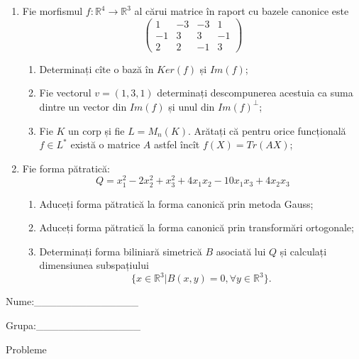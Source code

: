 \documentclass{article}
\begin{document}
\begin{enumerate}
 \item Fie morfismul $f:\mathbb{R}^4 \to \mathbb{R}^3$ al cărui matrice în raport cu bazele canonice este
$$\begin{pmatrix}
1&-3&-3&1\\
-1&3&3&-1\\
2&2&-1&3
\end{pmatrix}$$

\begin{enumerate}
\item Determinați cîte o bază în $Ker(f)$ și $Im(f)$;
\item Fie vectorul $v=(1,3,1)$ determinați descompunerea acestuia ca suma dintre un vector din $Im(f)$ și unul din $Im(f)^\perp$;
\item Fie $K$ un corp și fie $L=M_n(K)$. Arătați că pentru orice funcțională $f \in L^*$ există o matrice $A$ astfel încît $f(X)=Tr(AX)$;
\end{enumerate}
\item Fie forma pătratică:
$$Q= x_1^2-2x_2^2+x_3^2+4x_1x_2-10x_1x_3+4x_2x_3$$

\begin{enumerate}
\item Aduceți forma pătratică la forma canonică prin metoda Gauss;
\item Aduceți forma pătratică la forma canonică prin transformări ortogonale;
\item Determinați forma biliniară simetrică $B$ asociată lui $Q$ și calculați dimensiunea subspațiului
$$\{x \in \mathbb{R}^3 | B(x,y)=0,\forall y \in \mathbb{R}^3\}.$$

\end{enumerate}
\end{enumerate}
\newpage
\begin{flushright}
Nume:\_\_\_\_\_\_\_\_\_\_\_\_\_\_
 
 
Grupa:\_\_\_\_\_\_\_\_\_\_\_\_\_\_
\end{flushright}
\begin{center}
\vspace{2cm}
{\Large Probleme}
\vspace{2cm}
\end{center}
\end{document}
